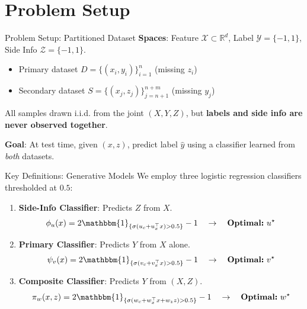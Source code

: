 \documentclass[aspectratio=169,xcolor={dvipsnames,table}]{beamer}
\newcommand{\R}{\mathbb{R}}
\newcommand{\ws}{w^\star}
\newcommand{\vs}{v^\star}
\newcommand{\us}{u^\star}
\begin{document}
\section{Problem Setup}
\begin{frame}{Problem Setup: Partitioned Dataset}
    \textbf{Spaces}: Feature $\mathcal{X} \subset \R^d$, Label $\mathcal{Y} = \{-1,1\}$, Side Info $\mathcal{Z} = \{-1,1\}$.
    
    \vspace{0.5cm}
    \begin{tcolorbox}[colback=LightBg, colframe=DarkBlue, title=\textbf{Partitioned Training Data}]
        \begin{itemize}
            \item Primary dataset $D = \{(x_i, y_i)\}_{i=1}^n$ (missing $z_i$)
            \item Secondary dataset $S = \{(x_j, z_j)\}_{j=n+1}^{n+m}$ (missing $y_j$)
        \end{itemize}
        \small All samples drawn i.i.d. from the joint $(X,Y,Z)$, but \textbf{labels and side info are never observed together}.
    \end{tcolorbox}
    
    \vspace{0.3cm}
    \textbf{Goal}: At test time, given $(x, z)$, predict label $\hat{y}$ using a classifier learned from \emph{both} datasets.
\end{frame}

\begin{frame}{Key Definitions: Generative Models}
    We employ three logistic regression classifiers thresholded at $0.5$:
    
    \vspace{0.3cm}
    \begin{enumerate}
        \item \textbf{Side-Info Classifier}: Predicts $Z$ from $X$.
        \[ \phi_u(x) = 2\mathbbm{1}_{\{\sigma(u_c + u_x^\top x) > 0.5\}} - 1 \quad \rightarrow \quad \textbf{Optimal:} \ \us \]
        
        \item \textbf{Primary Classifier}: Predicts $Y$ from $X$ alone.
        \[ \psi_v(x) = 2\mathbbm{1}_{\{\sigma(v_c + v_x^\top x) > 0.5\}} - 1 \quad \rightarrow \quad \textbf{Optimal:} \ \vs \]
        
        \item \textbf{Composite Classifier}: Predicts $Y$ from $(X, Z)$.
        \[ \pi_w(x,z) = 2\mathbbm{1}_{\{\sigma(w_c + w_x^\top x + w_z z) > 0.5\}} - 1 \quad \rightarrow \quad \textbf{Optimal:} \ \ws \]
    \end{enumerate}
\end{frame}
\end{document}
